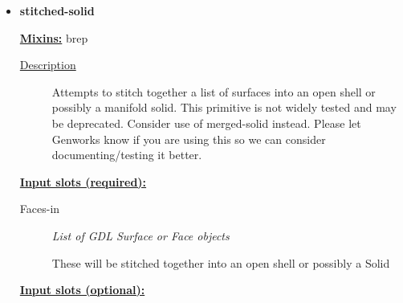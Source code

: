 \documentclass [11pt]{book}
\begin{document}
\begin{itemize}







\item {}
\label{prim:stitched-solid}
\textbf{stitched-solid}


\textbf{
\underline{Mixins:}} brep





\begin{description}

\item [
\underline{Description}]


Attempts to stitch together a list of
  surfaces into an open shell or possibly a manifold solid. This
  primitive is not widely tested and may be deprecated. Consider use
  of merged-solid instead. Please let Genworks know if you are using
  this so we can consider documenting/testing it better.



\end{description}








\textbf{
\underline{Input slots (required):}}

\begin{description}

\item [Faces-in]
\emph{List of GDL Surface or Face objects}

 These will be stitched together into an open shell or possibly a Solid




\end{description}






\textbf{
\underline{Input slots (optional):}}

\begin{description}


\end{description}
\end{itemize}
\end{document}
